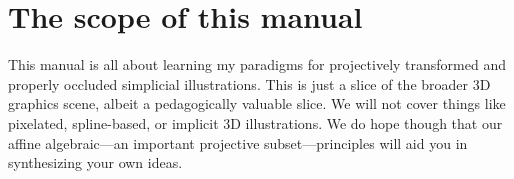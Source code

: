 \section{The scope of this manual}

This manual is all about learning my paradigms for projectively
transformed and properly occluded simplicial illustrations. This is 
just a slice of the broader 3D graphics scene, albeit a pedagogically 
valuable slice. We will not cover things like pixelated, spline-based, 
or implicit 3D illustrations. We do hope though that our affine 
algebraic---an important projective subset---principles will aid 
you in synthesizing your own ideas.




